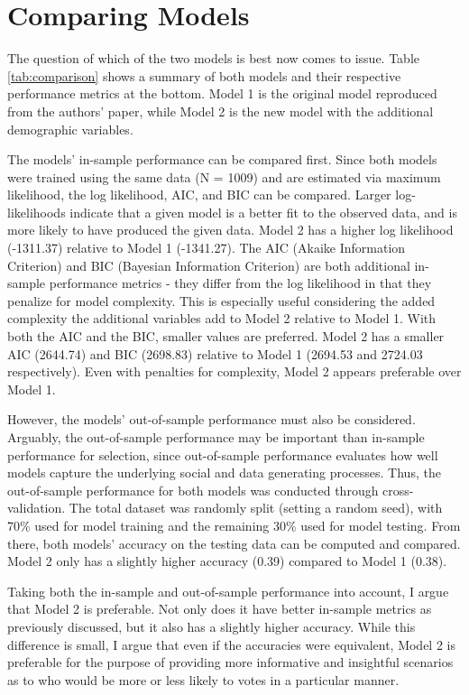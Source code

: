 \documentclass{article}
\begin{document}
\section{Comparing Models}
The question of which of the two models is best now comes to issue. Table \ref{tab:comparison} shows a summary of both models and their respective performance metrics at the bottom. Model 1 is the original model reproduced from the authors' paper, while Model 2 is the new model with the additional demographic variables.

The models' in-sample performance can be compared first. Since both models were trained using the same data (N = 1009) and are estimated via maximum likelihood, the log likelihood, AIC, and BIC can be compared. Larger log-likelihoods indicate that a given model is a better fit to the observed data, and is more likely to have produced the given data. Model 2 has a higher log likelihood (-1311.37) relative to Model 1 (-1341.27). The AIC (Akaike Information Criterion) and BIC (Bayesian Information Criterion) are both additional in-sample performance metrics - they differ from the log likelihood in that they penalize for model complexity. This is especially useful considering the added complexity the additional variables add to Model 2 relative to Model 1. With both the AIC and the BIC, smaller values are preferred. Model 2 has a smaller AIC (2644.74) and BIC (2698.83) relative to Model 1 (2694.53 and 2724.03 respectively). Even with penalties for complexity, Model 2 appears preferable over Model 1.

However, the models' out-of-sample performance must also be considered. Arguably, the out-of-sample performance may be important than in-sample performance for selection, since out-of-sample performance evaluates how well models capture the underlying social and data generating processes. Thus, the out-of-sample performance for both models was conducted through cross-validation. The total dataset was randomly split (setting a random seed), with 70\% used for model training and the remaining 30\% used for model testing. From there, both models' accuracy on the testing data can be computed and compared. Model 2 only has a slightly higher accuracy (0.39) compared to Model 1 (0.38). 

Taking both the in-sample and out-of-sample performance into account, I argue that Model 2 is preferable. Not only does it have better in-sample metrics as previously discussed, but it also has a slightly higher accuracy. While this difference is small, I argue that even if the accuracies were equivalent, Model 2 is preferable for the purpose of providing more informative and insightful scenarios as to who would be more or less likely to votes in a particular manner.
\end{document}
